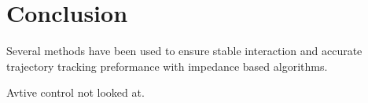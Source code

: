 \chapter{Conclusion}
\label{chapter:conclusion}






Several methods have been used to ensure stable interaction and accurate trajectory tracking preformance with impedance based algorithms.

Avtive control not looked at.

